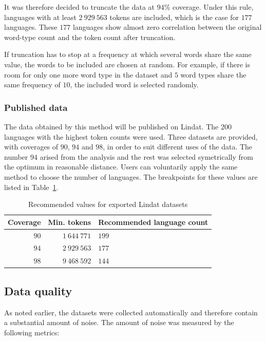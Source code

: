 It was therefore decided to truncate the data at $94\%$ coverage. Under this rule, languages with at least $2\ 929\ 563$ tokens are included, which is the case for $177$ languages. These $177$ languages show almost zero correlation between the original word-type count and the token count after truncation.

If truncation has to stop at a frequency at which several words share the same value, the words to be included are chosen at random. For example, if there is room for only one more word type in the dataset and $5$ word types share the same frequency of $10$, the included word is selected randomly.

\subsubsection{Published data}

The data obtained by this method will be published on Lindat. The 200 languages with the highest token counts were used. Three datasets are provided, with coverages of $90$, $94$ and $98$, in order to suit different uses of the data. The number $94$ arised from the analysis and the rest was selected symetrically from the optimum in reasonable distance. Users can voluntarily apply the same method to choose the number of languages. The breakpoints for these values are listed in Table~\ref{tab:breakpoints_for_export}.

\begin{table}[H]
    \centering
    \begin{tabular}{r|r|l}
        Coverage & Min. tokens & Recommended language count \\
        \hline\hline
        $90$ & $1\ 644\ 771$ & $199$ \\
        \hline
        $94$ & $2\ 929\ 563$ & $177$ \\
        \hline
        $98$ & $9\ 468\ 592$ & $144$ \\
        \hline
    \end{tabular}
    \caption{Recommended values for exported Lindat datasets}
    \label{tab:breakpoints_for_export}
\end{table}
\newpage
\subsection{Data quality}
\label{sec:data_quality}

As noted earlier, the datasets were collected automatically and therefore contain a substantial amount of noise. The amount of noise was measured by the following metrics:

